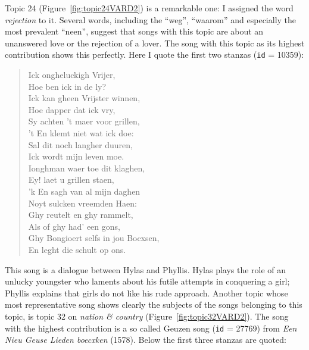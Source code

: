 Topic 24 (Figure~\ref{fig:topic24VARD2}) is a remarkable one: I assigned the word \textit{rejection} to it. Several words, including the \enquote{weg}, \enquote{waarom} and especially the most prevalent \enquote{neen}, suggest that songs with this topic are about an unanswered love or the rejection of a lover. The song with this topic as its highest contribution shows this perfectly. Here I quote the first two stanzas (\texttt{id} = 10359):

\begin{quote}
	Ick ongheluckigh Vrijer,\\
	Hoe ben ick in de ly?\\
	Ick kan gheen Vrijster winnen,\\
	Hoe dapper dat ick vry,\\
	Sy achten 't maer voor grillen,\\
	't En klemt niet wat ick doe:\\
	Sal dit noch langher duuren,\\
	Ick wordt mijn leven moe.\\
	
	Ionghman waer toe dit klaghen,\\
	Ey! laet u grillen staen,\\
	'k En sagh van al mijn daghen\\
	Noyt sulcken vreemden Haen:\\
	Ghy reutelt en ghy rammelt,\\
	Als of ghy had' een gons,\\
	Ghy Bongioert selfs in jou Bocxsen,\\
	En leght die schult op ons.
\end{quote}

\noindent This song is a dialogue between Hylas and Phyllis. Hylas plays the role of an unlucky youngster who laments about his futile attempts in conquering a girl; Phyllis explains that girls do not like his rude approach. Another topic whose most representative song shows clearly the subjects of the songs belonging to this topic, is topic 32 on \textit{nation \& country} (Figure~\ref{fig:topic32VARD2}). The song with the highest contribution is a so called Geuzen song (\texttt{id} = 27769) from \textit{Een Nieu Geuse Lieden boecxken} (1578). Below the first three stanzas are quoted:

